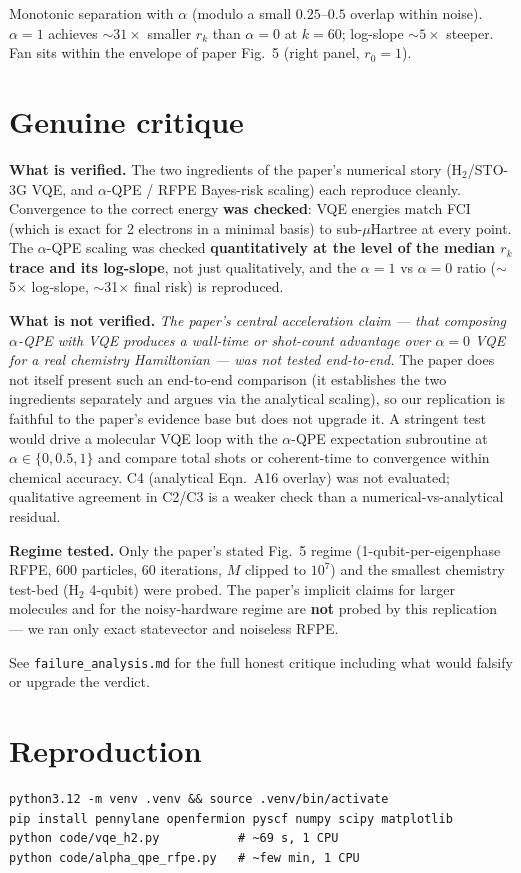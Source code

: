 \documentclass[11pt]{article}
\begin{document}
Monotonic separation with $\alpha$ (modulo a small $0.25$--$0.5$
overlap within noise). $\alpha{=}1$ achieves $\sim31\times$ smaller $r_k$ than
$\alpha{=}0$ at $k{=}60$; log-slope $\sim5\times$ steeper. Fan sits within the
envelope of paper Fig.~5 (right panel, $r_0 = 1$).

\section{Genuine critique}

\textbf{What is verified.} The two ingredients of the paper's numerical story
(H$_2$/STO-3G VQE, and $\alpha$-QPE / RFPE Bayes-risk scaling) each reproduce
cleanly. Convergence to the correct energy \textbf{was checked}: VQE energies
match FCI (which is exact for 2 electrons in a minimal basis) to sub-$\mu$Hartree
at every point. The $\alpha$-QPE scaling was checked \textbf{quantitatively at
the level of the median $r_k$ trace and its log-slope}, not just qualitatively,
and the $\alpha{=}1$ vs $\alpha{=}0$ ratio ($\sim$5$\times$ log-slope,
$\sim$31$\times$ final risk) is reproduced.

\textbf{What is not verified.} \emph{The paper's central acceleration claim ---
that composing $\alpha$-QPE with VQE produces a wall-time or shot-count
advantage over $\alpha{=}0$ VQE for a real chemistry Hamiltonian --- was not
tested end-to-end.} The paper does not itself present such an end-to-end
comparison (it establishes the two ingredients separately and argues via the
analytical scaling), so our replication is faithful to the paper's evidence
base but does not upgrade it. A stringent test would drive a molecular VQE
loop with the $\alpha$-QPE expectation subroutine at $\alpha \in \{0, 0.5, 1\}$
and compare total shots or coherent-time to convergence within chemical
accuracy. C4 (analytical Eqn.~A16 overlay) was not evaluated; qualitative
agreement in C2/C3 is a weaker check than a numerical-vs-analytical residual.

\textbf{Regime tested.} Only the paper's stated Fig.~5 regime
(1-qubit-per-eigenphase RFPE, 600 particles, 60 iterations, $M$ clipped to
$10^7$) and the smallest chemistry test-bed (H$_2$ 4-qubit) were probed.
The paper's implicit claims for larger molecules and for the noisy-hardware
regime are \textbf{not} probed by this replication --- we ran only exact
statevector and noiseless RFPE.

See \texttt{failure\_analysis.md} for the full honest critique including
what would falsify or upgrade the verdict.



\section*{Reproduction}

\begin{verbatim}
python3.12 -m venv .venv && source .venv/bin/activate
pip install pennylane openfermion pyscf numpy scipy matplotlib
python code/vqe_h2.py           # ~69 s, 1 CPU
python code/alpha_qpe_rfpe.py   # ~few min, 1 CPU
\end{verbatim}
\end{document}
